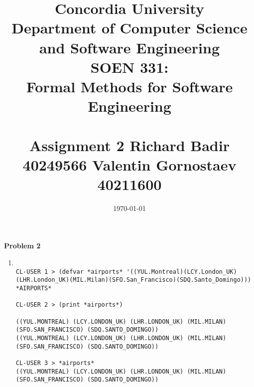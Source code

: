 \documentclass[12pt]{article}
\title{Concordia University\\
Department of Computer Science and Software Engineering\\
\textbf{SOEN 331:\\Formal Methods for Software Engineering}\\
\ \\
\textbf{Assignment 2}
\textbf{Richard Badir 40249566}
\textbf{Valentin Gornostaev 40211600}}
\date{\today}
\begin{document}
\maketitle
\newpage

\textbf{Problem 2}
\begin{enumerate}
\item
\begin{verbatim}

CL-USER 1 > (defvar *airports* '((YUL.Montreal)(LCY.London_UK)(LHR.London_UK)(MIL.Milan)(SFO.San_Francisco)(SDQ.Santo_Domingo)))
*AIRPORTS*

CL-USER 2 > (print *airports*)

((YUL.MONTREAL) (LCY.LONDON_UK) (LHR.LONDON_UK) (MIL.MILAN) (SFO.SAN_FRANCISCO) (SDQ.SANTO_DOMINGO)) 
((YUL.MONTREAL) (LCY.LONDON_UK) (LHR.LONDON_UK) (MIL.MILAN) (SFO.SAN_FRANCISCO) (SDQ.SANTO_DOMINGO))

CL-USER 3 > *airports*
((YUL.MONTREAL) (LCY.LONDON_UK) (LHR.LONDON_UK) (MIL.MILAN) (SFO.SAN_FRANCISCO) (SDQ.SANTO_DOMINGO))


\end{verbatim}
\end{enumerate}
\end{document}
